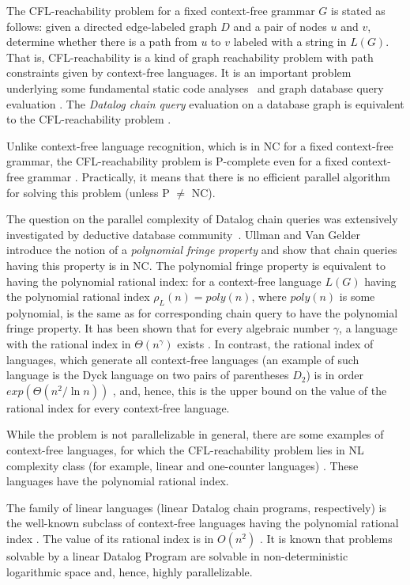 \documentclass[11pt,a4paper]{article} %
\begin{document}
The CFL-reachability problem for a fixed context-free grammar $G$ is stated as follows: given a directed edge-labeled graph $D$ and a pair of nodes  $u$ and $v$, determine whether there is a path from $u$ to $v$ labeled with a string in $L(G)$. That is, CFL-reachability is a kind of graph reachability problem with path constraints given by context-free languages. It is an important problem underlying some fundamental static code analyses~\cite{RepsBasic} and graph database query evaluation \cite{Yannakakis}. The \textit{Datalog chain query} evaluation on a database graph is equivalent to the CFL-reachability problem \cite{Ullman}. 


Unlike context-free language recognition, which is in NC for a fixed context-free grammar, the CFL-reachability problem is P-complete even for a fixed context-free grammar \cite{ PCompl}. Practically, it means that there is no efficient parallel algorithm for solving this problem (unless P $\neq$ NC). 


The question on the parallel complexity of Datalog chain queries was extensively investigated by deductive database community~\cite{ChainQ, Ullman}. Ullman and Van Gelder \cite{Ullman} introduce the notion of a \textit{polynomial fringe property} and show that chain queries having this property is in NC. The polynomial fringe property is equivalent to having the polynomial rational index: for a context-free language $L(G)$ having the polynomial rational index $\rho_L(n) = poly(n)$, where $poly(n)$ is some polynomial, is the same as for corresponding chain query to have the polynomial fringe property. It has been shown that for every algebraic number $\gamma$, a language with the rational index in $\Theta (n^\gamma )$ exists \cite{GreibRat}.  In contrast, the rational index of languages, which generate all context-free languages (an example of such language is the Dyck language on two pairs of parentheses $D_2$) is in order $exp(\Theta(n^2/\ln n))$ \cite{CFRat}, and, hence, this is the upper bound on the value of the rational index for every context-free language.


While the problem is not parallelizable in general, there are some examples of context-free languages, for which the CFL-reachability problem lies in NL complexity class (for example, linear and one-counter languages) \cite{labelledGraphs, LReach, Regularrealizability}. These languages have the polynomial rational index.


The family of linear languages (linear Datalog chain programs, respectively) is the well-known subclass of context-free languages having the polynomial rational index \cite{RatBasic, Ullman}. The value of its rational index is in $O(n^2)$ \cite{RatBasic}. It is known that problems solvable by a linear Datalog Program are solvable in non-deterministic logarithmic space and, hence,  highly parallelizable.
\end{document}
